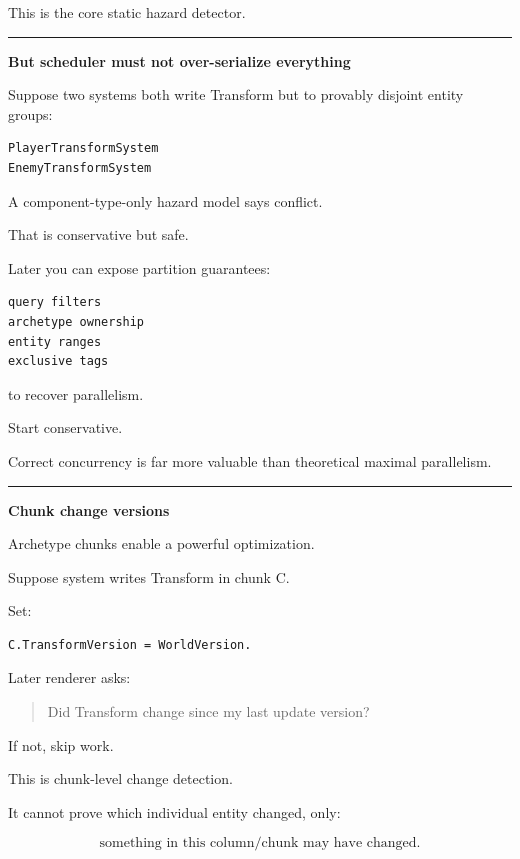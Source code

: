 This is the core static hazard detector.

\begin{center}\rule{0.5\linewidth}{0.5pt}\end{center}

\textbf{But scheduler must not over-serialize everything}

Suppose two systems both write Transform but to provably disjoint entity groups:

\begin{verbatim}
PlayerTransformSystem
EnemyTransformSystem
\end{verbatim}

A component-type-only hazard model says conflict.

That is conservative but safe.

Later you can expose partition guarantees:

\begin{verbatim}
query filters
archetype ownership
entity ranges
exclusive tags
\end{verbatim}

to recover parallelism.

Start conservative.

Correct concurrency is far more valuable than theoretical maximal parallelism.

\begin{center}\rule{0.5\linewidth}{0.5pt}\end{center}

\textbf{Chunk change versions}

Archetype chunks enable a powerful optimization.

Suppose system writes Transform in chunk C.

Set:

\begin{verbatim}
C.TransformVersion = WorldVersion.
\end{verbatim}

Later renderer asks:

\begin{quote}
Did Transform change since my last update version?
\end{quote}

If not, skip work.

This is chunk-level change detection.

It cannot prove which individual entity changed, only:

\[
\text{something in this column/chunk may have changed}.
\]


